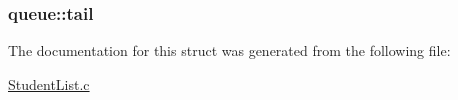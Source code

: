 \subsubsection[{\texorpdfstring{tail}{tail}}]{ queue\+::tail}\hypertarget{structqueue_a827de955c3490873a13e63e5478b444b}{}\label{structqueue_a827de955c3490873a13e63e5478b444b}


The documentation for this struct was generated from the following file\+:\begin{DoxyCompactItemize}
\item 
\hyperlink{StudentList_8c}{Student\+List.\+c}\end{DoxyCompactItemize}

